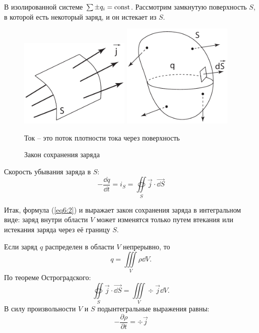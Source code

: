     В изолированной системе \( \sum \pm q_i = \mathrm{const} \). Рассмотрим замкнутую
    поверхность \( S \), в которой есть некоторый заряд, и он истекает из
    \( S \).
    \begin{figure}[b!]
        \center
        \includegraphics[width=0.47\textwidth]{lec06/flux_j.pdf}
        \hfill
        \includegraphics[width=0.47\textwidth]{lec06/emission.pdf}
        \parbox[t]{.47\textwidth}{\caption{Ток -- это поток плотности тока
                                                        через поверхность}}
        \hfill
        \parbox[t]{.47\textwidth}{\caption{Закон сохранения заряда}}
    \end{figure}
    
    Скорость убывания заряда в \( S \):
    \begin{equation}
        -\frac{\dd q}{\dd t} = i_S = \oiint\limits_S \vec{j}\cdot\vec{\dd S}
        \label{eq6:2}
    \end{equation}
    
    Итак, формула (\ref{eq6:2}) и выражает закон сохранения заряда в
    интегральном виде: заряд внутри области \( V \) может изменятся только
    путем втекания или истекания заряда через её границу \( S \).
    
    Если заряд \( q \) распределен в области \( V \) непрерывно, то
    \[
        q = \iiint\limits_V \rho \dd V.
    \]
    По теореме Остроградского:
    \[
        \oiint\limits_S \vec{j}\cdot\vec{\dd S} =
        \iiint\limits_V \div\vec{j}\dd V.
    \]
    В силу произвольности \( V \) и \( S \) подынтегральные выражения равны:
    \begin{equation}
        -\frac{\partial\rho}{\partial t} = \div\vec{j}
        \label{eq6:2a}
    \end{equation}
    
